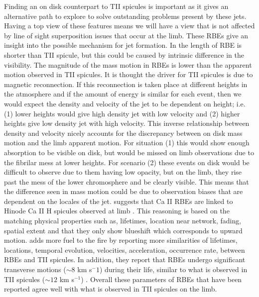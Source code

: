 \documentclass[12pt]{ociamthesis}
\newcommand{\np}{\\ \\}
\begin{document}
Finding an on disk counterpart to TII spicules is important as it gives an alternative path to explore to solve outstanding problems present by these jets. Having a top view of these features means we will have a view that is not affected by line of sight superposition issues that occur at the limb. These RBEs give an insight into the possible mechanism for jet formation. In \cite{Langangen2008ApJ} the length of RBE is shorter than TII spicule, but this could be caused by intrinsic difference in the visibility. The magnitude of the mass motion in RBEs is lower than the apparent motion observed in TII spicules. It is thought the driver for TII spicules is due to magnetic reconnection. If this reconnection is taken place at different heights in the atmosphere and if the amount of energy is similar for each event, then we would expect the density and velocity of the jet to be dependent on height; i.e. (1) lower heights would give high density jet with low velocity and (2) higher heights give low density jet with high velocity. This inverse relationship between density and velocity nicely accounts for the discrepancy between on disk mass motion and the limb apparent motion. For situation (1) this would show enough absorption to be visible on disk, but would be missed on limb observations due to the fibrilar mess at lower heights. For scenario (2) these events on disk would be difficult to observe due to them having low opacity, but on the limb, they rise past the mess of the lower chromosphere and be clearly visible. This means that the difference seen in mass motion could be due to observation biases that are dependent on the locales of the jet. \cite{Langangen2008ApJ} suggests that Ca II RBEs are linked to Hinode Ca II H spicules observed at limb \cite{Pontieu2007PASJ}. This reasoning is based on the matching physical properties such as, lifetimes, location near network, fading, spatial extent and that they only show blueshift which corresponds to upward motion. \cite{Rouppe2009ApJ} adds more fuel to the fire by reporting more similarities of lifetimes, locations, temporal evolution, velocities, acceleration, occurrence rate, between RBEs and TII spicules. In addition, they report that RBEs undergo significant transverse motions ($\sim 8$ km s$^-1$) during their life, similar to what is observed in  TII spicules ($\sim 12$ km s$^{-1}$) \cite{De_Pontieu2007}. Overall these parameters of RBEs that have been reported agree well with what is observed in TII spicules on the limb. \np
\end{document}
